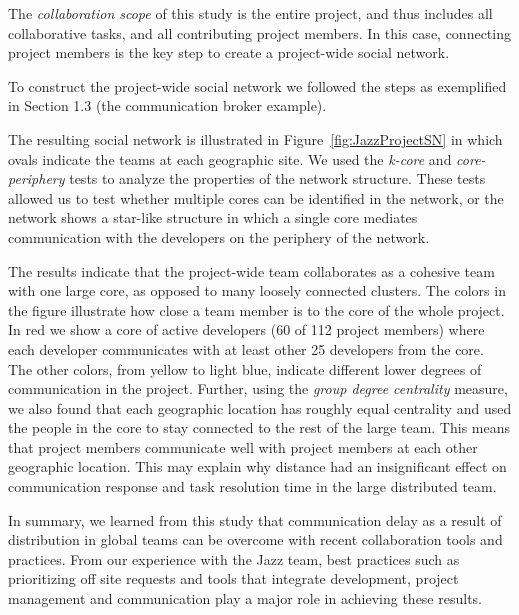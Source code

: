 \documentclass[12pt,oneside]{book}
\begin{document}
The \emph{collaboration scope} of this study is the entire project, and thus
includes all collaborative tasks, and all contributing project members. In this
case, connecting project members is the key step to create a project-wide social
network. 

To construct the project-wide social network we followed the steps as
exemplified in Section 1.3 (the communication broker example).


The resulting social network is illustrated in Figure~\ref{fig:JazzProjectSN} in
which ovals indicate the teams at each geographic site. We used the \emph{k-core}
and \emph{core-periphery} tests \cite{Wasserman:1994dz} to analyze the properties
of the network structure. These tests allowed us to test whether multiple
cores can be identified in the network, or the network shows a star-like 
structure in which a single core mediates communication with the developers on
the periphery of the network.

The results indicate that the project-wide team collaborates as a cohesive team
with one large core, as opposed to many loosely connected clusters. The colors in
the figure illustrate how close a team member is to the core of the whole
project. In red we show a core of active developers (60 of
112 project members) where each developer
communicates with at least other 25 developers from the core. The other
colors, from yellow to light blue, indicate different lower degrees of communication in
the project. Further, using the
\emph{group degree centrality} \cite{Wasserman:1994dz} measure, we also found
that each geographic location has roughly equal centrality and used the people in
the core to stay connected to the rest of the large team. This means that project
members communicate well with project members at each other geographic location.
This may explain why distance had an insignificant effect on communication response
and task resolution time in the large distributed team.

In summary, we learned from this study that communication delay as a result of
distribution in global teams can be overcome with recent
collaboration tools and practices. From our experience with the Jazz team, best practices such as prioritizing
off site requests and tools that integrate development, project
management and communication play a major role in achieving these results.
\end{document}
